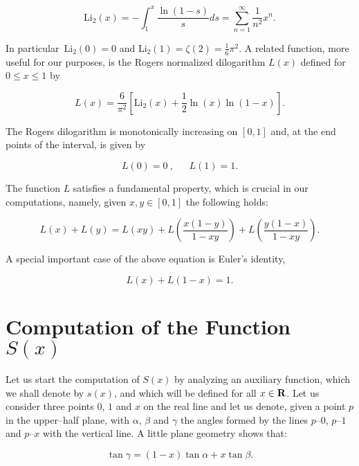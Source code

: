 \documentclass[a4paper,11pt]{article}
\newcommand{\mathbb}[1]{{\bf{#1}}}
\begin{document}
$$
\mathrm{Li}_2\left( x\right) =- \int_{1}^{x}\frac{\ln \left( 1-s\right) }{s} 
ds=\sum_{n=1}^{\infty }\frac{1}{n^{2}} x^n.
$$

\noindent
In particular\textrm{\ }$\mathrm{Li}_2\left( 0\right) =0$ and $\mathrm{ 
Li}_2\left( 1\right) =\zeta \left( 2\right) =\frac{1}{6}\pi ^{2}$. A
related function, more useful for our purposes, is the Rogers normalized
dilogarithm \cite{Rogers} $L\left( x\right) $ defined for $0\leq x\leq 1$ by 

$$
L\left( x\right) =\frac{6}{\pi ^{2}}\left[ \mathrm{Li}_2\left( x\right) + 
\frac{1}{2}\ln \left( x\right) \ln \left( 1-x\right) \right] .
$$

\noindent
The Rogers dilogarithm is monotonically increasing on $\left[ 0,1\right] $
and, at the end points of the interval, is given by

$$
L\left( 0\right) =0\ , \ \ \ \ \ \ \ L\left( 1\right) =1.
$$

\noindent
The function $L$ satisfies a fundamental property, which is crucial in our
computations, namely, given $x,y\in \left[ 0,1\right] $ the following holds:

\begin{equation}
L\left( x\right) +L\left( y\right) =L\left( xy\right) +L\left( \frac{x\left(
1-y\right) }{1-xy}\right) +L\left( \frac{y\left( 1-x\right) }{1-xy}\right) .
\label{app1}
\end{equation}

\noindent
A special important case of the above equation is Euler's identity,

$$
L\left( x\right) + L\left( 1-x\right) =1.
$$


\section{Computation of the Function $S\left( x\right) $}


Let us start the computation of $S(x)$ by analyzing an auxiliary function,
which we shall denote by $s\left( x\right)$, and which will be defined for 
all $x\in \mathbb{R}$. Let us consider three points $0$, $1$ and $x$ on the 
real line and let us denote, given a point $p$ in the upper--half plane, with 
$\alpha$, $\beta$ and $\gamma$ the angles formed by the lines $p$--$0$, 
$p$--$1$ and $p$--$x$ with the vertical line. A little plane geometry shows 
that:

\begin{equation}
\tan \gamma =\left( 1-x\right) \tan \alpha +x\tan \beta . \label{app2}
\end{equation}
\end{document}
